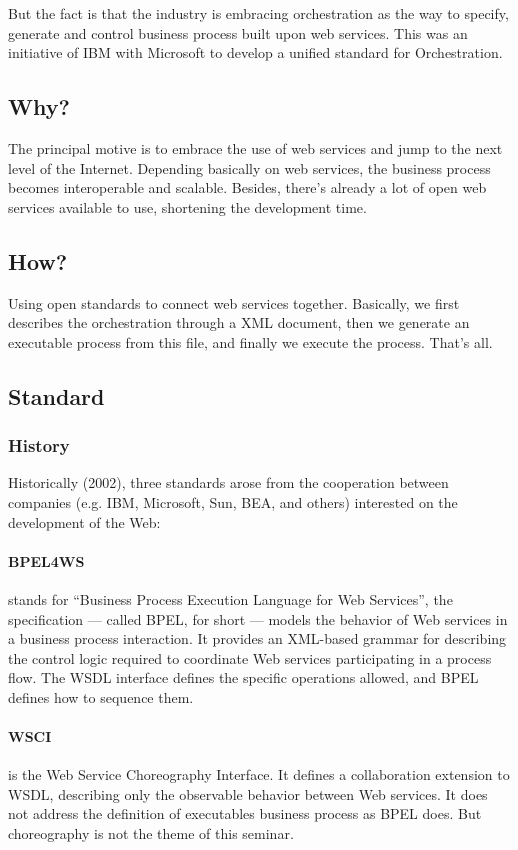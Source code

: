 \documentclass[12pt,a4paper]{article}
\begin{document}
But the fact is that the industry is embracing orchestration as the way to specify, generate and control business process built upon web services. This was an initiative of IBM with Microsoft to develop a unified standard for Orchestration.

\subsection{Why?}

The principal motive is to embrace the use of web services and jump to the next level of the Internet. Depending basically on web services, the business process becomes interoperable and scalable. Besides, there's already a lot of open web services available to use, shortening the development time.

\subsection{How?}
Using open standards to connect web services together.
Basically, we first describes the orchestration through a XML document, then we generate an executable process from this file, and finally we execute the process.
That's all.

\subsection{Standard}
\subsubsection{History}

Historically (2002), three standards arose from the cooperation between companies (e.g. IBM, Microsoft, Sun, BEA, and others) interested on the development of the Web:

\paragraph{BPEL4WS} 
stands for ``Business Process Execution Language for Web Services'', the specification — called BPEL, for short — models the behavior of Web services in a business process interaction. It provides an XML-based grammar for describing the control logic required to coordinate Web services participating in a process flow. The WSDL interface defines the specific operations allowed, and BPEL defines how to sequence them.

\paragraph{WSCI}
is the Web Service Choreography Interface. It defines a collaboration extension to WSDL, describing only the observable behavior between Web services. It does not address the definition of executables business process as BPEL does. But choreography is not the theme of this seminar.
\end{document}
